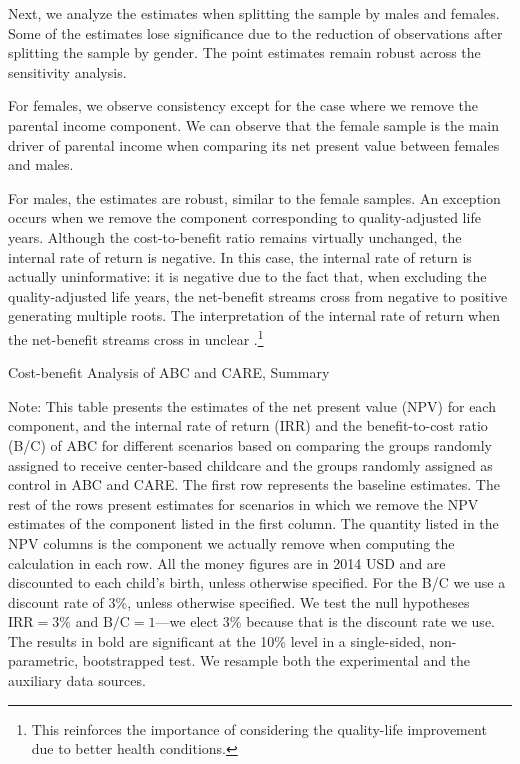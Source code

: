 Next, we analyze the estimates when splitting the sample by males and females. Some of the estimates lose significance due to the reduction of observations after splitting the sample by gender. The point estimates remain robust across  the sensitivity analysis.

For females, we observe consistency except for the case where we remove the parental income component. We can observe that the female sample is the main driver of parental income when comparing its net present value between females and males.

For males, the estimates are robust, similar to the female samples. An exception occurs when we remove the component corresponding to quality-adjusted life years. Although the cost-to-benefit ratio remains virtually unchanged, the internal rate of return is negative. In this case, the internal rate of return is actually uninformative: it is negative due to the fact that, when excluding the quality-adjusted life years, the net-benefit streams cross from negative to positive generating multiple roots. The interpretation of the internal rate of return when the net-benefit streams cross in unclear \citep{Arrow-Levhari_1969_EJ}.\footnote{This reinforces the importance of considering the quality-life improvement due to better health conditions.}

\begin{table}
\begin{threeparttable}
\caption{Cost-benefit Analysis of ABC and CARE, Summary}
\label{table:cba}
\centering

\begin{tablenotes}
\item Note: This table presents the estimates of the net present value (NPV) for each component, and the internal rate of return (IRR) and the benefit-to-cost ratio (B/C) of ABC for different scenarios based on comparing the groups randomly assigned to receive center-based childcare and the groups randomly assigned as control in ABC and CARE. The first row represents the baseline estimates. The rest of the rows present estimates for scenarios in which we remove the NPV estimates of the component listed in the first column. The quantity listed in the NPV columns is the component we actually remove when computing the calculation in each row. All the money figures are in 2014 USD and are discounted to each child's birth, unless otherwise specified. For the B/C we use a discount rate of $3\%$, unless otherwise specified. We test the null hypotheses $\text{IRR} = 3\%$ and $\text{B/C} = 1$---we elect $3\%$ because that is the discount rate we use. The results in bold are significant at the 10\% level in a single-sided, non-parametric, bootstrapped test. We resample both the experimental and the auxiliary data sources.
\end{tablenotes}
\end{threeparttable}
\end{table}

